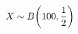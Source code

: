 \documentclass[preview]{standalone}
\begin{document}
\begin{align*}
\special{dvisvgm:raw <g id='unique000'>}X\sim B\!\left(100,\dfrac{1}{2}\right)\special{dvisvgm:raw </g>}
\end{align*}
\end{document}
